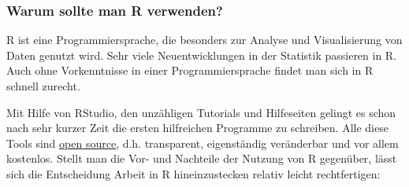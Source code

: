 \documentclass[]{article}
\begin{document}
\subsubsection*{\texorpdfstring{\textbf{Warum} sollte man \textbf{R}
verwenden?}{Warum sollte man R verwenden?}}\label{warum-sollte-man-r-verwenden}

R ist eine Programmiersprache, die besonders zur Analyse und
Visualisierung von Daten genutzt wird. Sehr viele Neuentwicklungen in
der Statistik passieren in R. Auch ohne Vorkenntnisse in einer
Programmiersprache findet man sich in R schnell zurecht.

Mit Hilfe von RStudio, den unzähligen Tutorials und Hilfeseiten gelingt
es schon nach sehr kurzer Zeit die ersten hilfreichen Programme zu
schreiben. Alle diese Tools sind
\href{https://de.wikipedia.org/wiki/Open_Source}{open source}, d.h.
transparent, eigenständig veränderbar und vor allem kostenlos. Stellt
man die Vor- und Nachteile der Nutzung von R gegenüber, lässt sich die
Entscheidung Arbeit in R hineinzustecken relativ leicht rechtfertigen:
\end{document}
